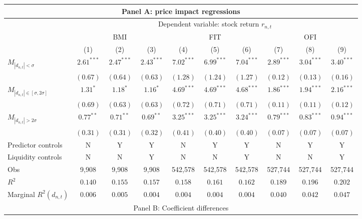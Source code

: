\begin{tabular}{lccccccccc}
  \hline \multicolumn{10}{c}{Panel A: price impact regressions} \\
 \hline
                                    & \multicolumn{9}{c}{Dependent variable: stock return $r_{n,t}$} \\

                                    \cmidrule(l){2-10} & \multicolumn{3}{c}{BMI} & \multicolumn{3}{c}{FIT} & \multicolumn{3}{c}{OFI} \\
 \cmidrule(l){2-4} \cmidrule(l){5-7} \cmidrule(l){8-10} 
  & (1) & (2) & (3) & (4) & (5) & (6) & (7) & (8) & (9) \\ 
  $M_{|d_{n,t}| < \sigma}$ & $2.61^{***}$ & $2.47^{***}$ & $2.43^{***}$ & $7.02^{***}$ & $6.99^{***}$ & $7.04^{***}$ & $2.89^{***}$ & $3.04^{***}$ & $3.40^{***}$ \\ 
   & $(0.67)$ & $(0.64)$ & $(0.63)$ & $(1.28)$ & $(1.24)$ & $(1.27)$ & $(0.12)$ & $(0.13)$ & $(0.16)$ \\ 
  $M_{|d_{n,t}| \in [\sigma, 2\sigma]}$ & $1.31^{*}$ & $1.18^{*}$ & $1.16^{*}$ & $4.69^{***}$ & $4.69^{***}$ & $4.68^{***}$ & $1.86^{***}$ & $1.94^{***}$ & $2.16^{***}$ \\ 
   & $(0.69)$ & $(0.63)$ & $(0.63)$ & $(0.72)$ & $(0.71)$ & $(0.71)$ & $(0.11)$ & $(0.11)$ & $(0.12)$ \\ 
  $M_{|d_{n,t}| > 2 \sigma}$ & $0.77^{**}$ & $0.71^{**}$ & $0.69^{**}$ & $3.25^{***}$ & $3.25^{***}$ & $3.24^{***}$ & $0.79^{***}$ & $0.83^{***}$ & $0.94^{***}$ \\ 
   \vspace{5pt} & $(0.31)$ & $(0.31)$ & $(0.32)$ & $(0.41)$ & $(0.40)$ & $(0.40)$ & $(0.07)$ & $(0.07)$ & $(0.07)$ \\ 
  Predictor controls & N & Y & Y & N & Y & Y & N & Y & Y \\ 
   \vspace{5pt}Liquidity controls & N & N & Y & N & N & Y & N & N & Y \\ 
  Obs & 9,908 & 9,908 & 9,908 & 542,578 & 542,578 & 542,578 & 527,744 & 527,744 & 527,744 \\ 
  $R^2$ & $0.140$ & $0.155$ & $0.157$ & $0.158$ & $0.161$ & $0.162$ & $0.189$ & $0.196$ & $0.202$ \\ 
  Marginal $R^2(d_{n,t})$ & $0.006$ & $0.005$ & $0.004$ & $0.004$ & $0.004$ & $0.004$ & $0.040$ & $0.042$ & $0.047$ \\ 
   \hline \multicolumn{10}{c}{Panel B: Coefficient differences} \\

\end{tabular}
